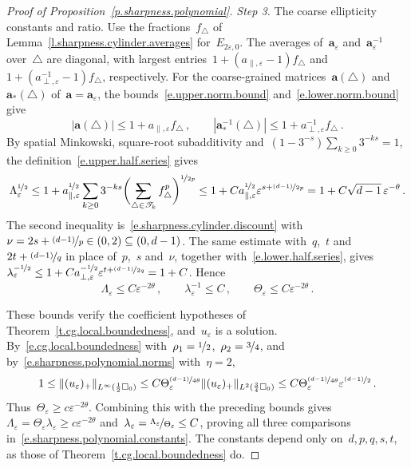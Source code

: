 \documentclass[11pt,letterpaper]{article}
\makeatletter
\numberwithin{equation}{section}
\theoremstyle{definition}
\renewcommand{\a}{\mathbf{a}}
\newcommand{\eps}{\varepsilon}
\newcommand{\nf}{\nicefrac}
\newcommand{\cu}{\square}
\DeclarePairedDelimiter{\norm}{\lVert}{\rVert}
\newcommand{\avsum}{\mathop{\mathpalette\avsuminner\relax}\displaylimits}
\newcommand\avsuminner[2]{%
	{\sbox0{$\m@th#1\sum$}%
		\vphantom{\usebox0}%
		\ooalign{%
			\hidewidth
			\smash{\,\rule[.23em]{8.8pt}{1.1pt} \relax}%
			\hidewidth\cr
			$\m@th#1\sum$\cr
		}%
	}%
}
\makeatother
\begin{document}
\begin{proof}[Proof of Proposition~\ref{p.sharpness.polynomial}]
\smallskip
\emph{Step 3.} The coarse ellipticity constants and ratio. Use the fractions~$f_\triangle$ of Lemma~\ref{l.sharpness.cylinder.averages} for~$E_{2\eps,0}$. The averages of~$\a_\eps$ and~$\a_\eps^{-1}$ over~$\triangle$ are diagonal, with largest entries~$1+(a_{\parallel,\eps}-1)f_\triangle$ and~$1+(a_{\perp,\eps}^{-1}-1)f_\triangle$, respectively. For the coarse-grained matrices~$\a(\triangle)$ and~$\a_*(\triangle)$ of~$\a=\a_\eps$, the bounds~\eqref{e.upper.norm.bound} and~\eqref{e.lower.norm.bound} give
\begin{equation*}
	|\a(\triangle)|\leq1+a_{\parallel,\eps}f_\triangle\,,\qquad|\a_*^{-1}(\triangle)|\leq1+a_{\perp,\eps}^{-1}f_\triangle\,.
\end{equation*}
By spatial Minkowski, square-root subadditivity and~$(1-3^{-s})\sum_{k\geq0}3^{-ks}=1$, the definition~\eqref{e.upper.half.series} gives
\begin{equation*}
	\Lambda_\eps^{\nf12}\leq1+a_{\parallel,\eps}^{\nf12}\sum_{k\geq0}3^{-ks}\biggl(\avsum_{\triangle\in\mathscr T_k}f_\triangle^p\biggr)^{\nf1{2p}}\leq1+Ca_{\parallel,\eps}^{\nf12}\eps^{s+\nf{(d-1)}{2p}}=1+C\sqrt{d-1}\,\eps^{-\theta}\,.
\end{equation*}
The second inequality is~\eqref{e.sharpness.cylinder.discount} with~$\nu=2s+\nf{(d-1)}p\in(0,2)\subseteq(0,d-1)$. The same estimate with~$q$,~$t$ and~$2t+\nf{(d-1)}q$ in place of~$p$,~$s$ and~$\nu$, together with~\eqref{e.lower.half.series}, gives~$\lambda_\eps^{-\nf12}\leq1+Ca_{\perp,\eps}^{-\nf12}\eps^{t+\nf{(d-1)}{2q}}=1+C$. Hence
\begin{equation*}
	\Lambda_\eps\leq C\eps^{-2\theta}\,,\qquad\lambda_\eps^{-1}\leq C\,,\qquad\Theta_\eps\leq C\eps^{-2\theta}\,.
\end{equation*}

\smallskip
These bounds verify the coefficient hypotheses of Theorem~\ref{t.cg.local.boundedness}, and~$u_\eps$ is a solution. By~\eqref{e.cg.local.boundedness} with~$\rho_1=\nf12$,~$\rho_2=\nf34$, and by~\eqref{e.sharpness.polynomial.norms} with~$\eta=2$,
\begin{equation*}
	1\leq\norm{(u_\eps)_+}_{L^\infty(\frac12\cu_0)}\leq C\Theta_\eps^{\nf{(d-1)}{4\theta}}\norm{(u_\eps)_+}_{L^2(\frac34\cu_0)}\leq C\Theta_\eps^{\nf{(d-1)}{4\theta}}\eps^{\nf{(d-1)}2}\,.
\end{equation*}
Thus~$\Theta_\eps\geq c\eps^{-2\theta}$. Combining this with the preceding bounds gives~$\Lambda_\eps=\Theta_\eps\lambda_\eps\geq c\eps^{-2\theta}$ and~$\lambda_\eps=\nf{\Lambda_\eps}{\Theta_\eps}\leq C$, proving all three comparisons in~\eqref{e.sharpness.polynomial.constants}. The constants depend only on~$d,p,q,s,t$, as those of Theorem~\ref{t.cg.local.boundedness} do.


\end{proof}
\end{document}
